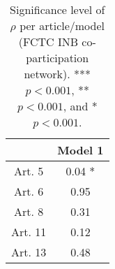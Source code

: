 \begin{table}[ht]
\centering
\begin{tabular}{cc}
  \toprule
 & Model 1 \\ 
  \midrule
Art. 5 & 0.04 * \\ 
   \midrule
Art. 6 & 0.95   \\ 
   \midrule
Art. 8 & 0.31   \\ 
   \midrule
Art. 11 & 0.12   \\ 
   \midrule
Art. 13 & 0.48   \\ 
   \bottomrule
\end{tabular}
\caption{Significance level of $\rho$ per article/model (FCTC INB co-participation network). *** $p < 0.001$, ** $p < 0.001$, and * $p < 0.001$.} 
\end{table}

